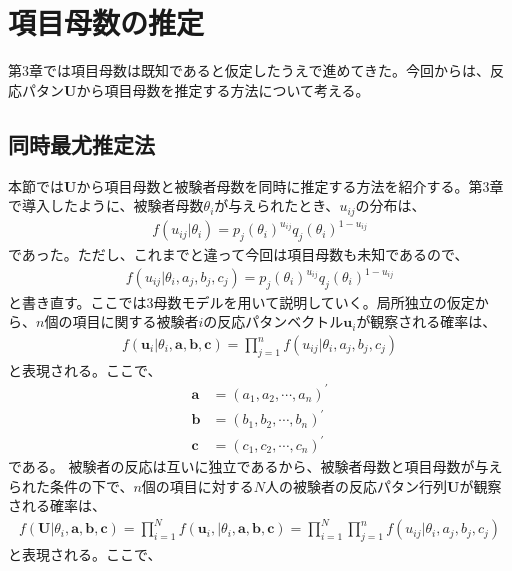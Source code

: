 \documentclass[12pt]{jarticle}
\begin{document}
\section{項目母数の推定}
第$3$章では項目母数は既知であると仮定したうえで進めてきた。今回からは、反応パタン$\boldsymbol U$から項目母数を推定する方法について考える。
\subsection{同時最尤推定法}
本節では$\boldsymbol U$から項目母数と被験者母数を同時に推定する方法を紹介する。第$3$章で導入したように、被験者母数$\theta_i$が与えられたとき、$u_{ij}$の分布は、
\begin{align}
  \label{03}
  \displaystyle f(u_{ij}|\theta_i) = p_j(\theta_i)^{u_{ij}}q_j(\theta_i)^{1-u_{ij}} \tag{4.1}
\end{align}
であった。ただし、これまでと違って今回は項目母数も未知であるので、
\begin{align}
  \label{04}
  \displaystyle f(u_{ij}|\theta_i,a_j,b_j,c_j) = p_j(\theta_i)^{u_{ij}}q_j(\theta_i)^{1-u_{ij}} \tag{4.2}
\end{align}
と書き直す。ここでは$3$母数モデルを用いて説明していく。局所独立の仮定から、$n$個の項目に関する被験者$i$の反応パタンベクトル$\boldsymbol u_i$が観察される確率は、
\begin{align}
  \label{05}
  \displaystyle f(\boldsymbol u_i|\theta_i,\boldsymbol a,\boldsymbol  b,\boldsymbol  c) = \prod_{j = 1}^{n} f(u_{ij}|\theta_i,a_j,b_j,c_j) \tag{4.3}
\end{align}
と表現される。ここで、
\begin{align}
  \label{06}
  \displaystyle \boldsymbol{a}&=(a_1,a_2,\cdots,a_n)^{\prime} \tag{4.4}\\
  \boldsymbol{b}&= (b_1,b_2,\cdots,b_n)^{\prime}\tag{4.5}\\
  \boldsymbol{c}&= (c_1,c_2,\cdots,c_n)^{\prime}\tag{4.6}
\end{align}
である。
被験者の反応は互いに独立であるから、被験者母数と項目母数が与えられた条件の下で、$n$個の項目に対する$N$人の被験者の反応パタン行列$\boldsymbol{U}$が観察される確率は、
\begin{align}
  \label{07}
  \displaystyle f(\boldsymbol{U}|\theta_i,\boldsymbol{a},\boldsymbol{b},\boldsymbol{c}) = \prod_{i = 1}^{N} f(\boldsymbol{u}_i,|\theta_i,\boldsymbol{a},\boldsymbol{b},\boldsymbol{c}) = \prod_{i = 1}^{N}\prod_{j = 1}^{n} f(u_{ij}|\theta_i,a_j,b_j,c_j)     \tag{4.7}
\end{align}
と表現される。ここで、
\end{document}
